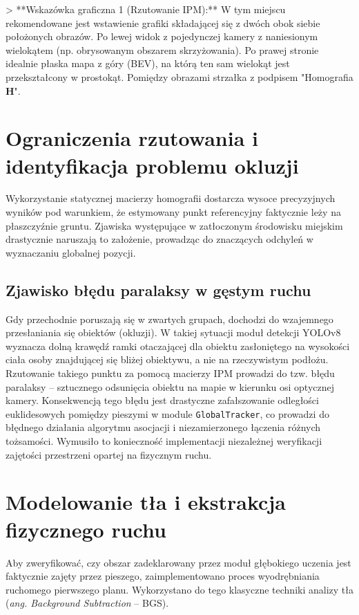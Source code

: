 > **Wskazówka graficzna 1 (Rzutowanie IPM):** W tym miejscu rekomendowane jest wstawienie grafiki składającej się z dwóch obok siebie położonych obrazów. Po lewej widok z pojedynczej kamery z naniesionym wielokątem (np. obrysowanym obszarem skrzyżowania). Po prawej stronie idealnie płaska mapa z góry (BEV), na którą ten sam wielokąt jest przekształcony w prostokąt. Pomiędzy obrazami strzałka z podpisem "Homografia $\mathbf{H}$".

\section{Ograniczenia rzutowania i identyfikacja problemu okluzji}

Wykorzystanie statycznej macierzy homografii dostarcza wysoce precyzyjnych wyników pod warunkiem,
że estymowany punkt referencyjny faktycznie leży na płaszczyźnie gruntu. Zjawiska występujące w
zatłoczonym środowisku miejskim drastycznie naruszają to założenie, prowadząc do znaczących
odchyleń w wyznaczaniu globalnej pozycji.

\subsection{Zjawisko błędu paralaksy w gęstym ruchu}
Gdy przechodnie poruszają się w zwartych grupach, dochodzi do wzajemnego przesłaniania się obiektów
(okluzji). W takiej sytuacji moduł detekcji YOLOv8 wyznacza dolną krawędź ramki otaczającej dla
obiektu zasłoniętego na wysokości ciała osoby znajdującej się bliżej obiektywu, a nie na
rzeczywistym podłożu. Rzutowanie takiego punktu za pomocą macierzy IPM prowadzi do tzw. błędu
paralaksy – sztucznego odsunięcia obiektu na mapie w kierunku osi optycznej kamery. Konsekwencją
tego błędu jest drastyczne zafałszowanie odległości euklidesowych pomiędzy pieszymi w module
\texttt{GlobalTracker}, co prowadzi do błędnego działania algorytmu asocjacji i niezamierzonego
łączenia różnych tożsamości. Wymusiło to konieczność implementacji niezależnej weryfikacji
zajętości przestrzeni opartej na fizycznym ruchu.

\section{Modelowanie tła i ekstrakcja fizycznego ruchu}

Aby zweryfikować, czy obszar zadeklarowany przez moduł głębokiego uczenia jest faktycznie zajęty
przez pieszego, zaimplementowano proces wyodrębniania ruchomego pierwszego planu. Wykorzystano do
tego klasyczne techniki analizy tła (\textit{ang. Background Subtraction} -- BGS).

